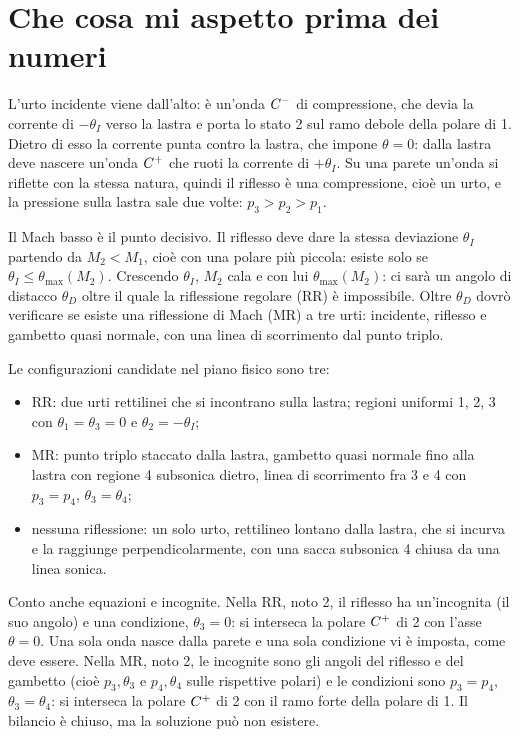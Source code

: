 \section*{Che cosa mi aspetto prima dei numeri}
L'urto incidente viene dall'alto: è un'onda $C^{-}$ di compressione, che devia la corrente di $-\theta_I$ verso la
lastra e porta lo stato 2 sul ramo debole della polare di 1. Dietro di esso la corrente punta contro la lastra, che
impone $\theta=0$: dalla lastra deve nascere un'onda $C^{+}$ che ruoti la corrente di $+\theta_I$. Su una parete
un'onda si riflette con la stessa natura, quindi il riflesso è una compressione, cioè un urto, e la pressione sulla
lastra sale due volte: $p_3>p_2>p_1$.

Il Mach basso è il punto decisivo. Il riflesso deve dare la stessa deviazione $\theta_I$ partendo da $M_2<M_1$, cioè
con una polare più piccola: esiste solo se $\theta_I\le\theta_{\max}(M_2)$. Crescendo $\theta_I$, $M_2$ cala e con lui
$\theta_{\max}(M_2)$: ci sarà un angolo di distacco $\theta_D$ oltre il quale la riflessione regolare (RR) è
impossibile. Oltre $\theta_D$ dovrò verificare se esiste una riflessione di Mach (MR) a tre urti: incidente, riflesso
e gambetto quasi normale, con una linea di scorrimento dal punto triplo.

Le configurazioni candidate nel piano fisico sono tre:
\begin{itemize}
\item RR: due urti rettilinei che si incontrano sulla lastra; regioni uniformi 1, 2, 3 con $\theta_1=\theta_3=0$ e
  $\theta_2=-\theta_I$;
\item MR: punto triplo staccato dalla lastra, gambetto quasi normale fino alla lastra con regione 4 subsonica dietro,
  linea di scorrimento fra 3 e 4 con $p_3=p_4$, $\theta_3=\theta_4$;
\item nessuna riflessione: un solo urto, rettilineo lontano dalla lastra, che si incurva e la raggiunge
  perpendicolarmente, con una sacca subsonica 4 chiusa da una linea sonica.
\end{itemize}

Conto anche equazioni e incognite. Nella RR, noto 2, il riflesso ha un'incognita (il suo angolo) e una condizione,
$\theta_3=0$: si interseca la polare $C^{+}$ di 2 con l'asse $\theta=0$. Una sola onda nasce dalla parete e una sola
condizione vi è imposta, come deve essere. Nella MR, noto 2, le incognite sono gli angoli del riflesso e del gambetto
(cioè $p_3,\theta_3$ e $p_4,\theta_4$ sulle rispettive polari) e le condizioni sono $p_3=p_4$, $\theta_3=\theta_4$:
si interseca la polare $C^{+}$ di 2 con il ramo forte della polare di 1. Il bilancio è chiuso, ma la soluzione può
non esistere.

